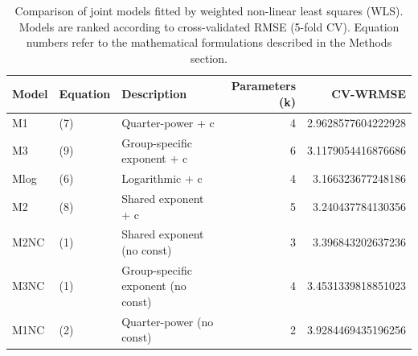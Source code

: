 \begin{table}
\caption{Comparison of joint models fitted by weighted non-linear least squares (WLS). Models are ranked according to cross-validated RMSE (5-fold CV). Equation numbers refer to the mathematical formulations described in the Methods section.}
\label{tab:model_comparison}
\begin{tabular}{llp{6cm}rr}
\toprule
Model & Equation & Description & Parameters (k) & CV-WRMSE \\
\midrule
M1 & (7) & Quarter-power + c & 4 & 2.9628577604222928 \\
M3 & (9) & Group-specific exponent + c & 6 & 3.1179054416876686 \\
Mlog & (6) & Logarithmic + c & 4 & 3.166323677248186 \\
M2 & (8) & Shared exponent + c & 5 & 3.240437784130356 \\
M2NC & (1) & Shared exponent (no const) & 3 & 3.396843202637236 \\
M3NC & (1) & Group-specific exponent (no const) & 4 & 3.4531339818851023 \\
M1NC & (2) & Quarter-power (no const) & 2 & 3.9284469435196256 \\
\bottomrule
\end{tabular}
\end{table}
